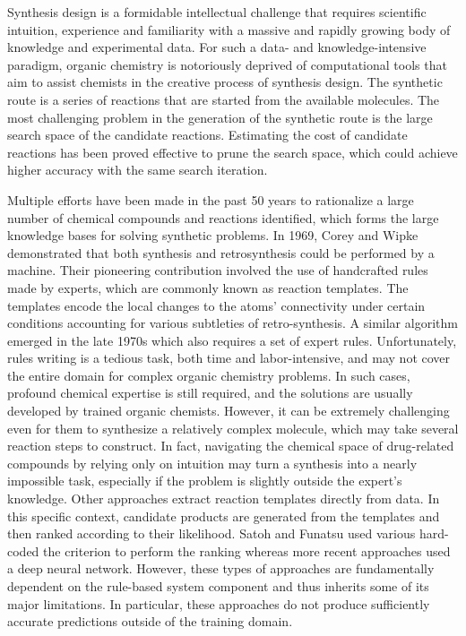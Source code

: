 \documentclass[%
 aip,
 jmp,%
 amsmath,amssymb,
 reprint,%
]{revtex4-2}
\begin{document}
Synthesis design\cite{dorwald2006side} is a formidable intellectual challenge that requires scientific intuition, experience and familiarity with
a massive and rapidly growing body of knowledge and experimental data. For such a data- and knowledge-intensive
paradigm, organic chemistry is notoriously deprived of computational tools that aim to assist chemists in the creative
process of synthesis design. The synthetic route is a series of reactions that are started from the available molecules. The
most challenging problem in the generation of the synthetic
route is the large search space of the candidate reactions. 
Estimating the cost of candidate reactions has been proved effective to prune the search space, 
which could achieve higher accuracy with the same search iteration.

Multiple efforts have been made in the past 50 years to
rationalize a large number of chemical compounds and
reactions identified, which forms the large knowledge bases for
solving synthetic problems. In 1969, Corey and Wipke\cite{corey1969computer}
demonstrated that both synthesis and retrosynthesis could be
performed by a machine. Their pioneering contribution
involved the use of handcrafted rules made by experts, which
are commonly known as reaction templates. The templates
encode the local changes to the atoms' connectivity under
certain conditions accounting for various subtleties of retro-synthesis. 
A similar algorithm emerged in the late 1970s\cite{salatin1980computer} which
also requires a set of expert rules. Unfortunately, rules writing is
a tedious task, both time and labor-intensive, and may not cover
the entire domain for complex organic chemistry problems. In
such cases, profound chemical expertise is still required, and
the solutions are usually developed by trained organic chemists.
However, it can be extremely challenging even for them to 
synthesize a relatively complex molecule, which may take
several reaction steps to construct. In fact, navigating the
chemical space of drug-related compounds by relying only on
intuition may turn a synthesis into a nearly impossible task,
especially if the problem is slightly outside the expert's
knowledge. Other approaches extract reaction templates directly from
data. In this specific context, candidate products are generated 
from the templates and then ranked according to their
likelihood. Satoh and Funatsu\cite{satoh1995sophia, satoh1996further} used various hard-coded
the criterion to perform the ranking whereas more recent
approaches\cite{segler2017neural, struble2020current} used a deep neural network. However, these types
of approaches are fundamentally dependent on the rule-based
system component and thus inherits some of its major limitations. 
In particular, these approaches do not produce sufficiently accurate 
predictions outside of the training domain.
\end{document}
